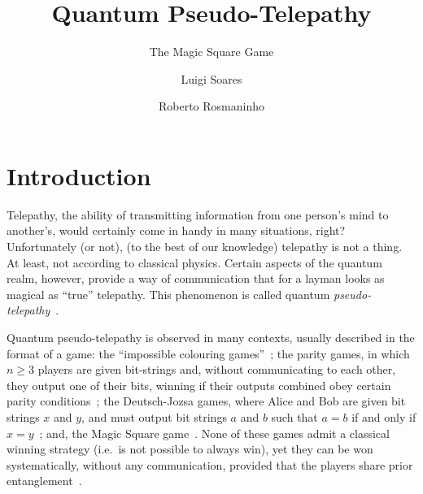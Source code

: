 \documentclass{llncs}
\begin{document}
\title{Quantum Pseudo-Telepathy}
\subtitle{The Magic Square Game}

\author{Luigi Soares \and Roberto Rosmaninho}

\maketitle

\section{Introduction}
\label{sec:intro}

Telepathy, the ability of transmitting information from one
person's mind to another's, would certainly come in handy in
many situations, right? Unfortunately (or not), (to the best
of our knowledge) telepathy is not a thing. At least, not
according to classical physics. Certain aspects of the
quantum realm, however, provide a way of communication that
for a layman looks as magical as ``true'' telepathy. This
phenomenon is called quantum
\emph{pseudo-telepathy}~\cite{brassard:2005}.


Quantum pseudo-telepathy is observed in many contexts,
usually described in the format of a game: the ``impossible
colouring games''~\cite{brassard:2005, Kochen1975}; the
parity games, in which \(n \geq 3\) players are given
bit-strings and, without communicating to each other, they
output one of their bits, winning if their outputs combined
obey certain parity conditions~\cite{brassard:2005,
  Mermin1990}; the Deutsch-Jozsa games, where Alice and Bob
are given bit strings \(x\) and \(y\), and must output bit
strings \(a\) and \(b\) such that \(a = b\) if and only if
\(x = y\)~\cite{brassard:2005, Brassard_1999}; and, the
Magic Square game~\cite{brassard:2005, Mermin1990}. None of
these games admit a classical winning strategy (i.e.\ is not
possible to always win), yet they can be won systematically,
without any communication, provided that the players share
prior entanglement~\cite{brassard:2005}.
\end{document}
